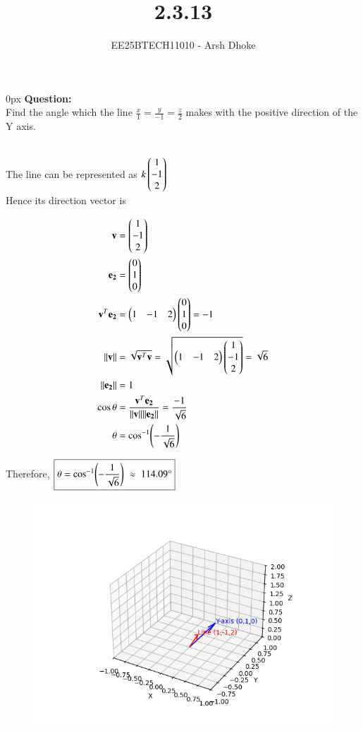 \documentclass[journal]{IEEEtran}
\begin{document}

\vspace{3cm}

\title{2.3.13}
\author{EE25BTECH11010 - Arsh Dhoke}
{\let\newpage\relax\maketitle}

\renewcommand{\thefigure}{\theenumi}
\renewcommand{\thetable}{\theenumi}
\setlength{\intextsep}{10pt}
\renewcommand{\thetable}{\theenumi}

\parindent 0px
\textbf{Question:} \\
Find the angle which the line $\frac{x}{1}=\frac{y}{-1}=\frac{z}{2}$ makes with the positive direction of the Y axis.

\solution \\

The line can be represented as
$k \begin{pmatrix}1\\-1\\2\end{pmatrix}$ 
\\

Hence its direction vector is

\begin{align}
\mathbf{v} &= \begin{pmatrix}1\\-1\\2\end{pmatrix} \\
\mathbf{e_2} &= \begin{pmatrix}0\\1\\0\end{pmatrix} \\
\mathbf{v}^T\mathbf{e_2} &= 
\begin{pmatrix}1 & -1 & 2\end{pmatrix}\begin{pmatrix}0\\1\\0\end{pmatrix}=-1 \\
\|\mathbf{v}\| &= 
\sqrt{\mathbf{v}^T\mathbf{v}}
=\sqrt{\begin{pmatrix}1 & -1 & 2\end{pmatrix}\begin{pmatrix}1\\-1\\2\end{pmatrix}}=\sqrt{6} \\
\|\mathbf{e_2}\| &=1 \\
\cos\theta &= 
\frac{\mathbf{v}^T\mathbf{e_2}}{\|\mathbf{v}\|\|\mathbf{e_2}\|}
=\frac{-1}{\sqrt{6}} \\
\theta &= \cos^{-1}\!\left(-\frac{1}{\sqrt{6}}\right)
\end{align}

Therefore,
$
\boxed{\theta=\cos^{-1}\!\left(-\frac{1}{\sqrt{6}}\right)\;\approx\;114.09\degree}
$

\begin{figure}[ht!]
\centering
\includegraphics[height=0.6\textheight, keepaspectratio]{figs/q3.png}
\end{figure}
\end{document}
